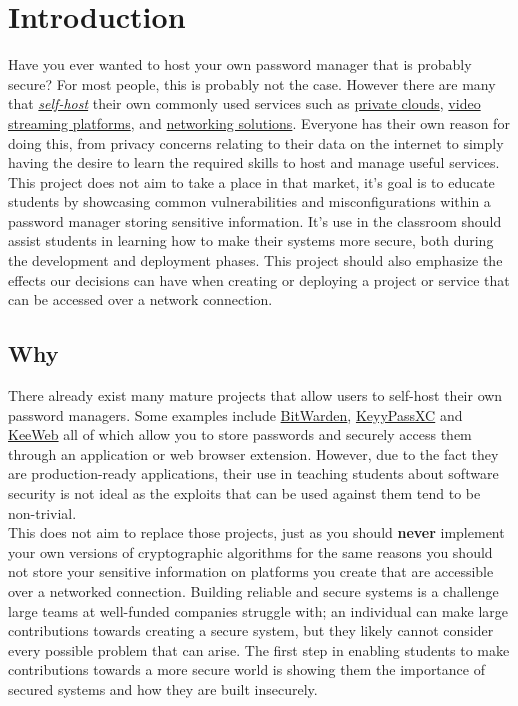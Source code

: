 
\section{Introduction}
Have you ever wanted to host your own password manager that is probably secure? For most people, this is probably not the case. However there are many that \textit{\href{https://en.wikipedia.org/wiki/Self-hosting_(web_services)}{self-host}}\cite{self} their own commonly used services such as \href{https://nextcloud.com/}{private clouds}, \href{https://jellyfin.org/}{video streaming platforms}, and \href{https://pi-hole.net/}{networking solutions}. Everyone has their own reason for doing this, from privacy concerns relating to their data on the internet to simply having the desire to learn the required skills to host and manage useful services.\\

\noindent This project does not aim to take a place in that market, it's goal is to educate students by showcasing common vulnerabilities and misconfigurations within a password manager storing sensitive information. It's use in the classroom should assist students in learning how to make their systems more secure, both during the development and deployment phases. This project should also emphasize the effects our decisions can have when creating or deploying a project or service that can be accessed over a network connection.

\subsection{Why}
\noindent There already exist many mature projects that allow users to self-host their own password managers. Some examples include \href{https://bitwarden.com/help/install-on-premise-linux/}{BitWarden}, \href{https://github.com/keepassxreboot/keepassxc}{KeyyPassXC} and \href{https://github.com/keeweb/keeweb}{KeeWeb} all of which allow you to store passwords and securely access them through an application or web browser extension. However, due to the fact they are production-ready applications, their use in teaching students about software security is not ideal as the exploits that can be used against them tend to be non-trivial.\\

\noindent This does not aim to replace those projects, just as you should \textbf{never} implement your own versions of cryptographic algorithms for the same reasons you should not store your sensitive information on platforms you create that are accessible over a networked connection. Building reliable and secure systems is a challenge large teams at well-funded companies struggle with; an individual can make large contributions towards creating a secure system, but they likely cannot consider every possible problem that can arise. The first step in enabling students to make contributions towards a more secure world is showing them the importance of secured systems and how they are built insecurely.

